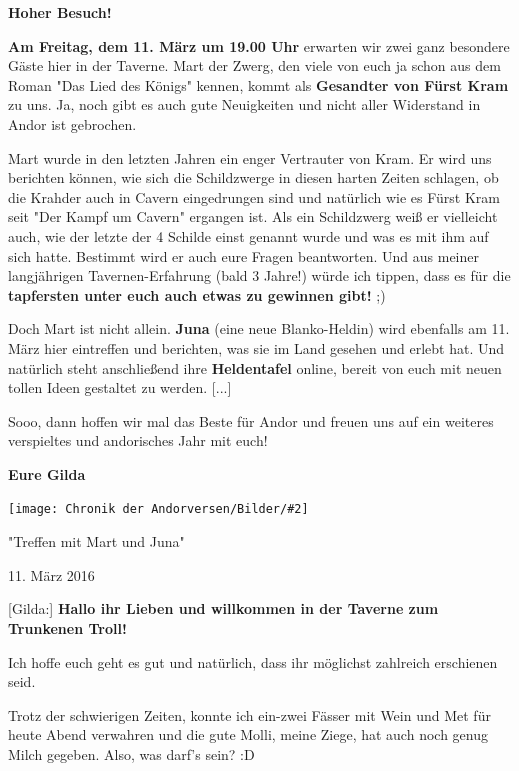 \documentclass[10pt, a4paper, oneside]{book}
\newcommand{\bildmitts}[2][height=0.32\textwidth,width=0.48\textwidth,keepaspectratio]{%
    \begin{center}
        \texttt{[image: Chronik der Andorversen/Bilder/\#2]}
    \end{center}
}
\begin{document}
\begin{multicols}{2}


\textbf{Hoher Besuch!}

\textbf{Am Freitag, dem 11. März um 19.00 Uhr} erwarten wir zwei ganz besondere Gäste hier in der Taverne. Mart der Zwerg, den viele von euch ja schon aus dem Roman "Das Lied des Königs" kennen, kommt als \textbf{Gesandter von Fürst Kram} zu uns. Ja, noch gibt es auch gute Neuigkeiten und nicht aller Widerstand in Andor ist gebrochen.

Mart wurde in den letzten Jahren ein enger Vertrauter von Kram. Er wird uns berichten können, wie sich die Schildzwerge in diesen harten Zeiten schlagen, ob die Krahder auch in Cavern eingedrungen sind und natürlich wie es Fürst Kram seit "Der Kampf um Cavern" ergangen ist. Als ein Schildzwerg weiß er vielleicht auch, wie der letzte der 4 Schilde einst genannt wurde und was es mit ihm auf sich hatte. Bestimmt wird er auch eure Fragen beantworten. Und aus meiner langjährigen Tavernen-Erfahrung (bald 3 Jahre!) würde ich tippen, dass es für die \textbf{tapfersten unter euch auch etwas zu gewinnen gibt!} ;)

Doch Mart ist nicht allein. \textbf{Juna} (eine neue Blanko-Heldin) wird ebenfalls am 11. März hier eintreffen und berichten, was sie im Land gesehen und erlebt hat. Und natürlich steht anschließend ihre \textbf{Heldentafel} online, bereit von euch mit neuen tollen Ideen gestaltet zu werden. [...]

Sooo, dann hoffen wir mal das Beste für Andor und freuen uns auf ein weiteres verspieltes und andorisches Jahr mit euch!


\textbf{Eure Gilda}



\bildmitts{AA2016 Ausblick 3.jpeg}





\begin{center}
    "Treffen mit Mart und Juna"

    11. März 2016
\end{center}


[Gilda:] \textbf{Hallo ihr Lieben und willkommen in der Taverne zum Trunkenen Troll!}

Ich hoffe euch geht es gut und natürlich, dass ihr möglichst zahlreich erschienen seid.

Trotz der schwierigen Zeiten, konnte ich ein-zwei Fässer mit Wein und Met für heute Abend verwahren und die gute Molli, meine Ziege, hat auch noch genug Milch gegeben. Also, was darf’s sein? :D


\end{multicols}
\end{document}
